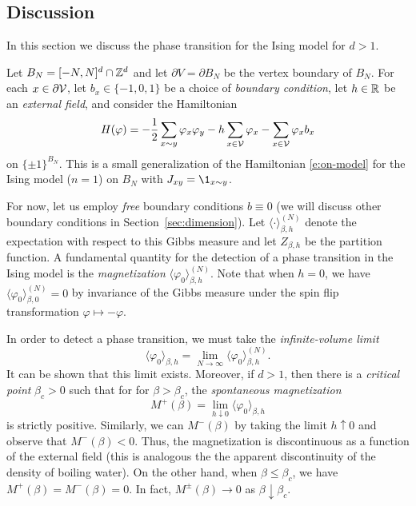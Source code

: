 \subsection{Discussion}


In this section we discuss the phase transition for the Ising model for $d > 1$.

Let $B_N = [-N, N]^d \cap { {{\mathbb Z}}^d }$ and let $\partial V = \partial B_N$ be the
vertex boundary of $B_N$. For each $x\in\partial\mathcal{V}$, let $b_x \in \{-1, 0, 1\}$
be a choice of \emph{boundary condition}, let $h \in {\mathbb R}$ be an \emph{external field},
and consider the Hamiltonian
\begin{equation}
H(\varphi)
	=
-\frac12 \sum_{x \sim y} \varphi_x \varphi_y
- h \sum_{x\in\mathcal{V}} \varphi_x
- \sum_{x\in\mathcal{V}} \varphi_x b_x
\end{equation}
on $\{\pm1\}^{B_N}$. This is a small generalization of the Hamiltonian \eqref{e:on-model}
for the Ising model ($n = 1$) on $B_N$ with $\jay_{xy} = \1_{x\sim y}$.

For now, let us employ \emph{free} boundary conditions $b \equiv 0$ (we will discuss
other boundary conditions in Section~\ref{sec:dimension}).
Let $\langle\cdot\rangle^{(N)}_{\beta,h}$ denote the expectation with respect to
this Gibbs measure and let $Z_{\beta,h}$ be the partition function.
A fundamental quantity for the detection of a phase transition in the Ising model is the
\emph{magnetization} $\langle \varphi_0 \rangle^{(N)}_{\beta,h}$.
Note that when $h = 0$, we have $\langle \varphi_0 \rangle^{(N)}_{\beta,0} = 0$
by invariance of the Gibbs measure under the spin flip transformation $\varphi \mapsto -\varphi$.

In order to detect a phase transition, we must take the \emph{infinite-volume limit}
\begin{equation}
\langle \varphi_0 \rangle_{\beta,h}
	=
\lim_{N\to\infty} \langle \varphi_0 \rangle^{(N)}_{\beta,h}.
\end{equation}
It can be shown that this limit exists. Moreover, if $d > 1$, then there is a
\emph{critical point} $\beta_c > 0$ such that for for $\beta > \beta_c$, the
\emph{spontaneous magnetization}
\begin{equation}
M^+(\beta) = \lim_{h\downarrow0} \langle \varphi_0 \rangle_{\beta,h}
\end{equation}
is strictly positive. Similarly, we can $M^-(\beta)$ by taking the limit
$h\uparrow0$ and observe that $M^-(\beta) < 0$. Thus, the magnetization is
discontinuous as a function of the external field (this is analogous the the
apparent discontinuity of the density of boiling water). On the other hand,
when $\beta \le \beta_c$, we have $M^+(\beta) = M^-(\beta) = 0$. In fact,
$M^\pm(\beta) \to 0$ as $\beta\downarrow\beta_c$.

